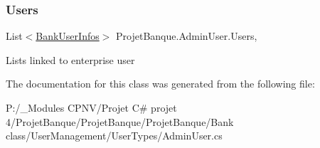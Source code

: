 \subsubsection{\texorpdfstring{Users}{Users}}
{\footnotesize\ttfamily List$<$\mbox{\hyperlink{class_projet_banque_1_1_bank_user_infos}{Bank\+User\+Infos}}$>$ Projet\+Banque.\+Admin\+User.\+Users\hspace{0.3cm}{\ttfamily [get]}, {\ttfamily [set]}}



Lists linked to enterprise user 



The documentation for this class was generated from the following file\+:\begin{DoxyCompactItemize}
\item 
P\+:/\+\_\+\+Modules C\+P\+N\+V/\+Projet C\# projet 4/\+Projet\+Banque/\+Projet\+Banque/\+Projet\+Banque/\+Bank class/\+User\+Management/\+User\+Types/Admin\+User.\+cs\end{DoxyCompactItemize}
